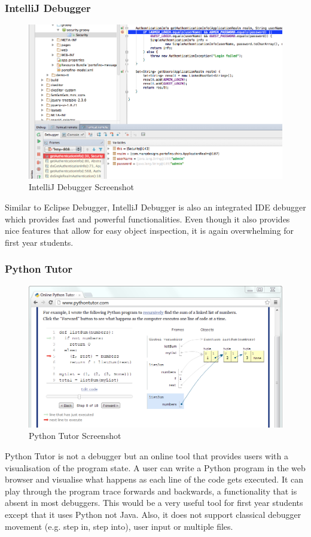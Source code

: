 \documentclass[11pt, a4paper]{article}
\begin{document}
\subsubsection{IntelliJ Debugger}
\begin{figure}[h!]
\centering
\includegraphics[width=125mm]{intellij.png}
\caption{IntelliJ Debugger Screenshot}
\end{figure}

Similar to Eclipse Debugger, IntelliJ Debugger is also an integrated IDE debugger which provides fast and powerful functionalities.
Even though it also provides nice features that allow for easy object inspection, it is again overwhelming for first year students.
\subsubsection{Python Tutor}
\begin{figure}[h!]
\centering
\includegraphics[width=125mm]{pythontutor.png}
\caption{Python Tutor Screenshot}
\end{figure}

Python Tutor is not a debugger but an online tool that provides users with a visualisation of the program state.
A user can write a Python program in the web browser and visualise what happens as each line of the code gets executed.
It can play through the program trace forwards and backwards, a functionality that is absent in most debuggers.
This would be a very useful tool for first year students except that it uses Python not Java. Also, it does not support classical debugger movement (e.g. step in, step into), user input or multiple files.
\end{document}
